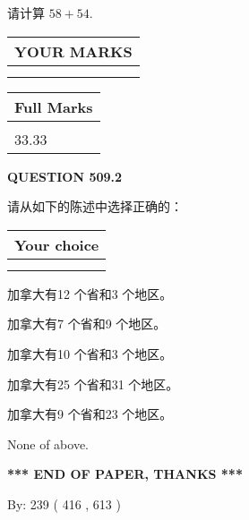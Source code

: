 \documentclass{ctexart}
\begin{document}
  
 
请计算 $ %
58 +  %
54 $.
 

 

 
  
\vspace{0.2in}
  
\noindent\begin{tabular}{|l|}
\hline
 YOUR MARKS  \\
\hline
 \\ 
 \\ 
\hline
\end{tabular}
\hspace{0.05in} \begin{tabular}{|l|}
\hline
 Full Marks  \\
\hline
 \\ 
33.33 \\
\hline
\end{tabular}
{\textbf{\Large{QUESTION
509.2 
}}}
  
  
请从如下的陈述中选择正确的：
  
  
\noindent\hspace{3.0in} \begin{tabular}{|l|}
\hline
Your choice \\
\hline
 \\ 
 \\ 
\hline
\end{tabular}
  
  
 
 
加拿大有12 个省和3 个地区。
 
 
加拿大有7 个省和9 个地区。
 
 
加拿大有10 个省和3 个地区。
 
 
加拿大有25 个省和31 个地区。
 
 
加拿大有9 个省和23 个地区。
 
 
 None of above.
 
 
   
   
 \vspace{0.2in}
 
   
   
   
   
\vspace{1.0in} 
{\textbf{\large{ *** END OF PAPER, THANKS *** }}} 
   
   
\hspace{1.0in} By: 
 239 ( 416 ,  613 )
   
\end{document}
